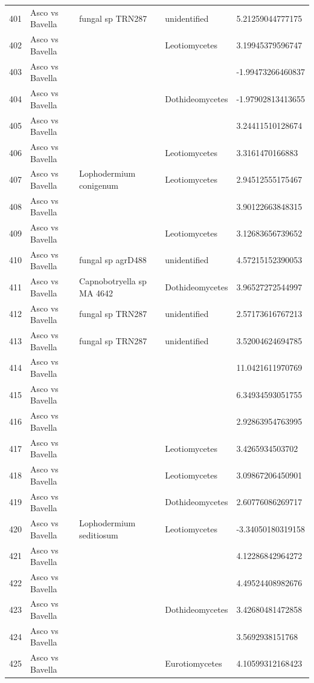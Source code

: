 \documentclass[12pt]{article}\usepackage[]{graphicx}\usepackage[]{color}
\numberwithin{figure}{section}
\begin{document}
\begin{table}[ht]
\begin{tabular}{lllll}
  401 & Asco vs Bavella & fungal sp TRN287 & unidentified & 5.21259044777175 \\ 
  402 & Asco vs Bavella &  & Leotiomycetes & 3.19945379596747 \\ 
  403 & Asco vs Bavella &  &  & -1.99473266460837 \\ 
  404 & Asco vs Bavella &  & Dothideomycetes & -1.97902813413655 \\ 
  405 & Asco vs Bavella &  &  & 3.24411510128674 \\ 
  406 & Asco vs Bavella &  & Leotiomycetes & 3.3161470166883 \\ 
  407 & Asco vs Bavella & Lophodermium conigenum & Leotiomycetes & 2.94512555175467 \\ 
  408 & Asco vs Bavella &  &  & 3.90122663848315 \\ 
  409 & Asco vs Bavella &  & Leotiomycetes & 3.12683656739652 \\ 
  410 & Asco vs Bavella & fungal sp agrD488 & unidentified & 4.57215152390053 \\ 
  411 & Asco vs Bavella & Capnobotryella sp MA 4642 & Dothideomycetes & 3.96527272544997 \\ 
  412 & Asco vs Bavella & fungal sp TRN287 & unidentified & 2.57173616767213 \\ 
  413 & Asco vs Bavella & fungal sp TRN287 & unidentified & 3.52004624694785 \\ 
  414 & Asco vs Bavella &  &  & 11.0421611970769 \\ 
  415 & Asco vs Bavella &  &  & 6.34934593051755 \\ 
  416 & Asco vs Bavella &  &  & 2.92863954763995 \\ 
  417 & Asco vs Bavella &  & Leotiomycetes & 3.4265934503702 \\ 
  418 & Asco vs Bavella &  & Leotiomycetes & 3.09867206450901 \\ 
  419 & Asco vs Bavella &  & Dothideomycetes & 2.60776086269717 \\ 
  420 & Asco vs Bavella & Lophodermium seditiosum & Leotiomycetes & -3.34050180319158 \\ 
  421 & Asco vs Bavella &  &  & 4.12286842964272 \\ 
  422 & Asco vs Bavella &  &  & 4.49524408982676 \\ 
  423 & Asco vs Bavella &  & Dothideomycetes & 3.42680481472858 \\ 
  424 & Asco vs Bavella &  &  & 3.5692938151768 \\ 
  425 & Asco vs Bavella &  & Eurotiomycetes & 4.10599312168423 \\ 

\end{tabular}
\end{table}
\end{document}
